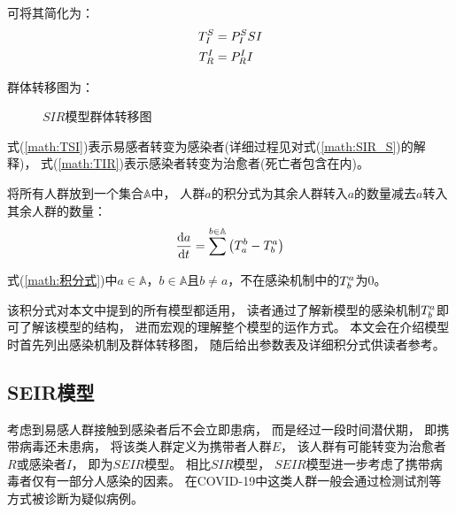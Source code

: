 \par 可将其简化为：
\begin{align}
    T^{S}_{I}&=P^{S}_{I}SI \label{math:TSI} \\
    T^{I}_{R}&=P^{I}_{R}I \label{math:TIR}
\end{align}
\par 群体转移图为：
\begin{figure}[H]
    \centering
    \caption{$SIR$模型群体转移图}
\end{figure}
\par 式(\ref{math:TSI})表示易感者转变为感染者(详细过程见对式(\ref{math:SIR_S})的解释)，
式(\ref{math:TIR})表示感染者转变为治愈者(死亡者包含在内)。
\par 将所有人群放到一个集合$\mathbb{A}$中，
人群$a$的积分式为其余人群转入$a$的数量减去$a$转入其余人群的数量：
\begin{equation}
    \frac{\mathrm{d}a}{\mathrm{d}t} = \sum^{b\in \mathbb{A}}\left(T^{b}_{a}-T^{a}_{b}\right)\label{math:积分式}
\end{equation}
\par 式(\ref{math:积分式})中$a\in\mathbb{A}$，$b\in\mathbb{A}$且$b\not=a$，不在感染机制中的$T^{a}_{b}$为$0$。
\par 该积分式对本文中提到的所有模型都适用，
读者通过了解新模型的感染机制$T^{a}_{b}$即可了解该模型的结构，
进而宏观的理解整个模型的运作方式。
本文会在介绍模型时首先列出感染机制及群体转移图，
随后给出参数表及详细积分式供读者参考。
\subsection{SEIR模型\label{sec:SEIR}}
\par 考虑到易感人群接触到感染者后不会立即患病，
而是经过一段时间潜伏期，
即携带病毒还未患病，
将该类人群定义为携带者人群$E$，
该人群有可能转变为治愈者$R$或感染者$I$，
即为$SEIR$模型。
相比$SIR$模型，
$SEIR$模型进一步考虑了携带病毒者仅有一部分人感染的因素。
在COVID-19中这类人群一般会通过检测试剂等方式被诊断为疑似病例。
